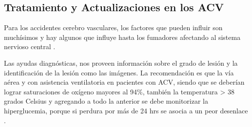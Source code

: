 \doublespacing
\subsection{Tratamiento y Actualizaciones en los ACV}
\par Para los accidentes cerebro vasculares, los factores que pueden influir son muchísimos y hay algunos que influye hasta los fumadores afectando al sistema nervioso central  \cite{Piloto2020}. 
\par Las ayudas diagnósticas, nos proveen información sobre el grado de lesión y la identificación de la lesión \cite{Wintermark2013} como las imágenes. La recomendación es que la vía aérea y con asistencia ventilatoria en pacientes con ACV, siendo que se deberían lograr saturaciones de oxígeno mayores al 94\%, también la temperatura > 38 grados Celsius y agregando a todo la anterior se debe monitorizar la hiperglucemia, porque si perdura por más de 24 hrs se asocia a un peor desenlace \cite{Garcia2019}.\\
